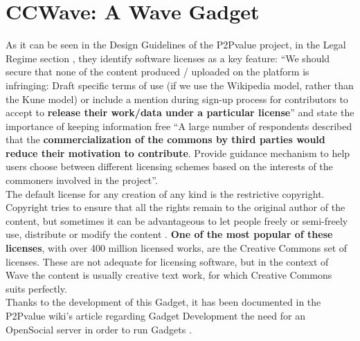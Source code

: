 \thispagestyle{sectioned}
\chapter{CCWave: A Wave Gadget}
\label{subsec:cc_intro}
As it can be seen in the Design Guidelines of the P2Pvalue project, in the Legal Regime section \cite{ref:p2pvalue}, they identify software licenses as a key feature: ``We should secure that none of the content produced / uploaded on the platform is infringing: Draft specific terms of use (if we use the Wikipedia model, rather than the Kune model)  or include a mention during sign-up process for contributors to accept to \textbf{release their work/data under a particular license}'' and state the importance of keeping information free ``A large number of respondents described that the \textbf{commercialization of the commons by third parties would reduce their motivation to contribute}. Provide guidance mechanism to help users choose between different licensing schemes based on the interests of the commoners involved in the project''.\\[.2cm]
The default license for any creation of any kind is the restrictive copyright. Copyright tries to ensure that all the rights remain to the original author of the content, but sometimes it can be advantageous to let people freely or semi-freely use, distribute or modify the content \cite{ref:oss_why}. \textbf{One of the most popular of these licenses}, with over 400 million \cite{ref:the_power_of_open} licensed works, are the Creative Commons set of licenses. These are not adequate for licensing software, but in the context of Wave the content is usually creative text work, for which Creative Commons suits perfectly.\\[.2cm]
Thanks to the development of this Gadget, it has been documented in the P2Pvalue wiki's article regarding Gadget Development the need for an OpenSocial server in order to run Gadgets \cite{ref:gadget_development}.

